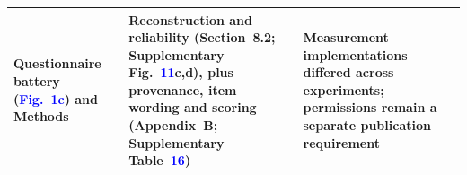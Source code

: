 \begin{center}
\begin{tabularx}{\textwidth}{@{}>{\raggedright\arraybackslash}p{3.2cm}>{\raggedright\arraybackslash}p{5.6cm}>{\raggedright\arraybackslash}X@{}}
Questionnaire battery (\textcolor{blue}{Fig.~1c}) and Methods & Reconstruction and reliability (Section~8.2; Supplementary Fig.~\textcolor{blue}{11}c,d), plus provenance, item wording and scoring (Appendix~B; Supplementary Table~\textcolor{blue}{16}) & Measurement implementations differed across experiments; permissions remain a separate publication requirement \\
\bottomrule
\end{tabularx}
\end{center}
